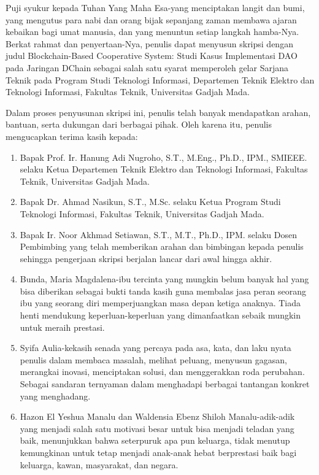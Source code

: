 Puji syukur kepada Tuhan Yang Maha Esa-yang menciptakan langit dan bumi, yang mengutus para nabi dan orang bijak sepanjang zaman membawa ajaran kebaikan bagi umat manusia, dan yang menuntun setiap langkah hamba-Nya. Berkat rahmat dan penyertaan-Nya, penulis dapat menyusun skripsi dengan judul Blockchain-Based Cooperative System: Studi Kasus Implementasi DAO pada Jaringan DChain sebagai salah satu syarat memperoleh gelar Sarjana Teknik pada Program Studi Teknologi Informasi, Departemen Teknik Elektro dan Teknologi Informasi, Fakultas Teknik, Universitas Gadjah Mada.

Dalam proses penyusunan skripsi ini, penulis telah banyak mendapatkan arahan, bantuan, serta dukungan dari berbagai pihak. Oleh karena itu, penulis mengucapkan terima kasih kepada:

\begin{enumerate}[leftmargin=*]
	\item Bapak Prof. Ir. Hanung Adi Nugroho, S.T., M.Eng., Ph.D., IPM., SMIEEE. selaku Ketua Departemen Teknik Elektro dan Teknologi Informasi, Fakultas Teknik, Universitas Gadjah Mada.
	
	\item Bapak Dr. Ahmad Nasikun, S.T., M.Sc. selaku Ketua Program Studi Teknologi Informasi, Fakultas Teknik, Universitas Gadjah Mada.
	
	\item Bapak Ir. Noor Akhmad Setiawan, S.T., M.T., Ph.D., IPM. selaku Dosen Pembimbing yang telah memberikan arahan dan bimbingan kepada penulis sehingga pengerjaan skripsi berjalan lancar dari awal hingga akhir.
	
	\item Bunda, Maria Magdalena-ibu tercinta yang mungkin belum banyak hal yang bisa diberikan sebagai bukti tanda kasih guna membalas jasa peran seorang ibu yang seorang diri memperjuangkan masa depan ketiga anaknya. Tiada henti mendukung keperluan-keperluan yang dimanfaatkan sebaik mungkin untuk meraih prestasi.
	
	\item Syifa Aulia-kekasih senada yang percaya pada asa, kata, dan laku nyata penulis dalam membaca masalah, melihat peluang, menyusun gagasan, merangkai inovasi, menciptakan solusi, dan menggerakkan roda perubahan. Sebagai sandaran ternyaman dalam menghadapi berbagai tantangan konkret yang menghadang.
	
	\item Hazon El Yeshua Manalu dan Waldensia Ebenz Shiloh Manalu-adik-adik yang menjadi salah satu motivasi besar untuk bisa menjadi teladan yang baik, menunjukkan bahwa seterpuruk apa pun keluarga, tidak menutup kemungkinan untuk tetap menjadi anak-anak hebat berprestasi baik bagi keluarga, kawan, masyarakat, dan negara.
	

\end{enumerate}
